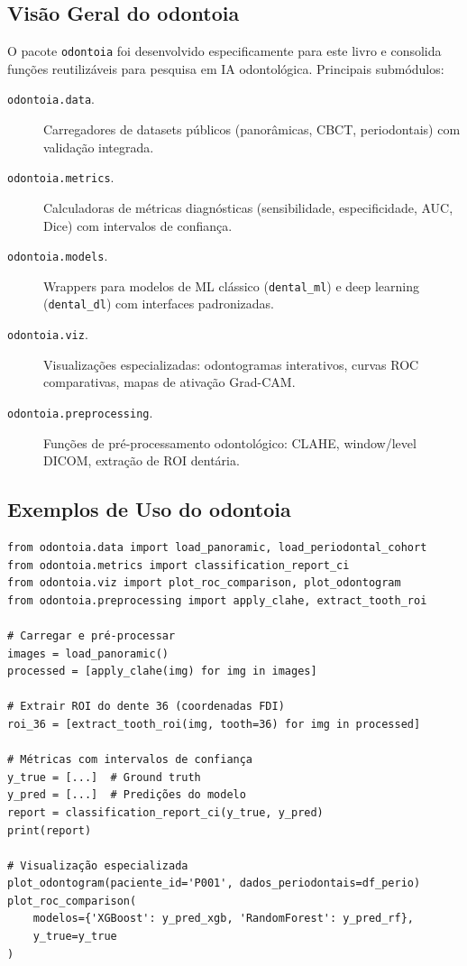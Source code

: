 \subsection{Visão Geral do odontoia}

O pacote \texttt{odontoia}  foi desenvolvido especificamente para este livro e consolida funções reutilizáveis para pesquisa em IA odontológica. Principais submódulos:

\begin{description}
    \item[\texttt{odontoia.data}.] Carregadores de datasets públicos (panorâmicas, CBCT, periodontais) com validação integrada.
    \item[\texttt{odontoia.metrics}.] Calculadoras de métricas diagnósticas (sensibilidade, especificidade, AUC, Dice) com intervalos de confiança.
    \item[\texttt{odontoia.models}.] Wrappers para modelos de ML clássico (\texttt{dental\_ml}) e deep learning (\texttt{dental\_dl}) com interfaces padronizadas.
    \item[\texttt{odontoia.viz}.] Visualizações especializadas: odontogramas interativos, curvas ROC comparativas, mapas de ativação Grad-CAM.
    \item[\texttt{odontoia.preprocessing}.] Funções de pré-processamento odontológico: CLAHE, window/level DICOM, extração de ROI dentária.
\end{description}

\subsection{Exemplos de Uso do odontoia}

\begin{verbatim}
from odontoia.data import load_panoramic, load_periodontal_cohort
from odontoia.metrics import classification_report_ci
from odontoia.viz import plot_roc_comparison, plot_odontogram
from odontoia.preprocessing import apply_clahe, extract_tooth_roi

# Carregar e pré-processar
images = load_panoramic()
processed = [apply_clahe(img) for img in images]

# Extrair ROI do dente 36 (coordenadas FDI)
roi_36 = [extract_tooth_roi(img, tooth=36) for img in processed]

# Métricas com intervalos de confiança
y_true = [...]  # Ground truth
y_pred = [...]  # Predições do modelo
report = classification_report_ci(y_true, y_pred)
print(report)

# Visualização especializada
plot_odontogram(paciente_id='P001', dados_periodontais=df_perio)
plot_roc_comparison(
    modelos={'XGBoost': y_pred_xgb, 'RandomForest': y_pred_rf},
    y_true=y_true
)
\end{verbatim}

